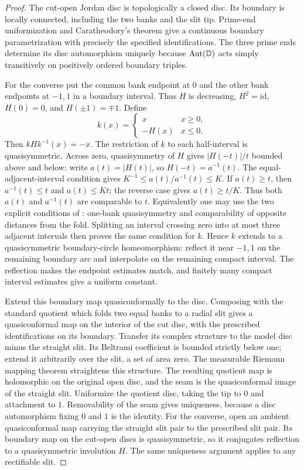 \begin{proof}
The cut-open Jordan disc is topologically a closed disc. Its
boundary is locally connected, including the two banks and the
slit tip. Prime-end uniformization and Caratheodory's theorem
give a continuous boundary parametrization with precisely the
specified identifications. The three prime ends determine its
disc automorphism uniquely because $\operatorname{Aut}({\mathbb{D}})$
acts simply transitively on positively ordered boundary triples.

For the converse put the common bank endpoint at $0$ and the
other bank endpoints at $-1,1$ in a boundary interval. Thus
$H$ is decreasing, $H^2=\mathrm{id}$, $H(0)=0$, and
$H(\pm1)=\mp1$. Define
\[
 k(x)=\begin{cases}x&x\geq0,\\-H(x)&x\leq0.\end{cases}
\]
Then $kHk^{-1}(x)=-x$. The restriction of $k$ to each
half-interval is quasisymmetric. Across zero, quasisymmetry
of $H$ gives $|H(-t)|/t$ bounded above and below: write $a(t)=|H(t)|$, so $H(-t)=a^{-1}(t)$.
The equal-adjacent-interval condition gives
$K^{-1}\le a(t)/a^{-1}(t)\le K$. If $a(t)\ge t$, then
$a^{-1}(t)\le t$ and $a(t)\le Kt$; the reverse case gives
$a(t)\ge t/K$. Thus both $a(t)$ and $a^{-1}(t)$ are
comparable to $t$.
Equivalently one may use the two explicit conditions of
\citet[Lemma 6]{Lind2005}: one-bank quasisymmetry and
comparability of opposite distances from the fold. Splitting
an interval crossing zero into at most three adjacent
intervals then proves the same condition for $k$. Hence $k$
extends to a quasisymmetric boundary-circle homeomorphism:
reflect it near $-1,1$ on the remaining boundary arc and
interpolate on the remaining compact interval. The reflection
makes the endpoint estimates match, and finitely many compact
interval estimates give a uniform constant.

Extend this boundary map quasiconformally to the disc.
Composing with the standard quotient which folds two equal
banks to a radial slit gives a quasiconformal map on the
interior of the cut disc, with the prescribed identifications
on its boundary. Transfer its complex structure to the
model disc minus the straight slit. Its Beltrami coefficient
is bounded strictly below one; extend it arbitrarily over
the slit, a set of area zero. The measurable Riemann mapping
theorem straightens this structure. The resulting quotient
map is holomorphic on the original open disc, and the seam
is the quasiconformal image of the straight slit. Uniformize
the quotient disc, taking the tip to $0$ and attachment to
$1$. Removability of the seam gives uniqueness, because a
disc automorphism fixing $0$ and $1$ is the identity.
For the converse, open an ambient quasiconformal map carrying
the straight slit pair to the prescribed slit pair. Its
boundary map on the cut-open discs is quasisymmetric, so it
conjugates reflection to a quasisymmetric involution $H$.
The same uniqueness argument applies to any rectifiable slit.


\end{proof}
